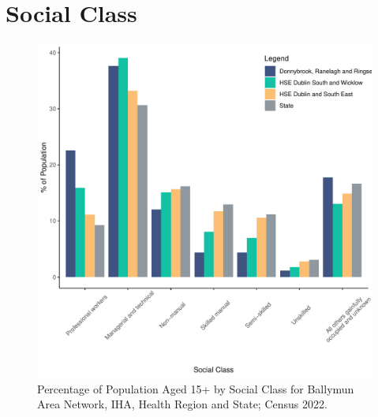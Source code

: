 \documentclass{article}
\begin{document}
\section{Social Class}\label{sect:SC}
\begin{figure}[H]
	\centering
	\includegraphics[width = 140mm]{../figures/SocialClassED.pdf}
	\caption{Percentage of Population Aged 15+ by Social Class for Ballymun Area Network, IHA, Health Region and State; Census 2022.}
	\label{fig:vbnv}
	\end{figure}
\end{document}
